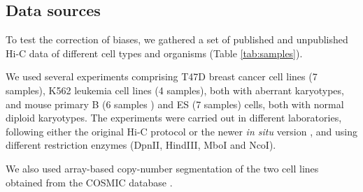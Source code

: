 \documentclass{bioinfo}
\begin{document}
\begin{methods}
\subsection{Data sources}

To test the correction of biases, we gathered a set of
published \citep{ledily2014distinct, encode2012integrated, rao20143d,
stadhouders2017transcription, lin2012global, dixon2012topological} and
unpublished Hi-C data of different cell types and organisms
(Table \ref{tab:samples}).

We used several experiments comprising T47D breast cancer cell
lines (7 samples), K562 leukemia cell lines (4 samples), both with
aberrant karyotypes, and mouse primary B (6 samples ) and ES (7 samples)
cells, both with normal diploid karyotypes. The experiments were carried
out in different laboratories, following either the original Hi-C protocol
\citep{lieberman2009comprehensive} or the newer \textit{in situ} version
\citep{rao20143d}, and using different restriction enzymes (DpnII,
HindIII, MboI and NcoI).

We also used array-based copy-number segmentation of the two cell
lines obtained from the COSMIC database \citep{forbes2010cosmic}.


\end{methods}
\end{document}
